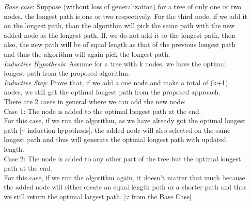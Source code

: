 \documentclass{article}
\begin{document}
\textit{Base case}: Suppose (without loss of generalization) for a tree of only one or two nodes, the longest path is one or two respectively. For the third node, if we add it on the longest path, than the algorithm will pick the same path with the new added node as the longest path. If, we do not add it to the longest path, then also, the new path will be of equal length as that of the previous longest path and thus the algorithm will again pick the longest path.\\

\textit{Inductive Hypothesis}: Assume for a tree with k nodes, we have the optimal longest path from the proposed algorithm.\\

\textit{Inductive Step}: Prove that, if we add a one node and make a total of (k+1) nodes, we still get the optimal longest path from the proposed approach.\\

There are 2 cases in general where we can add the new node:\\
Case 1: The node is added to the optimal longest path at the end.\\
For this case, if we run the algorithm, as we have already got the optimal longest path [$\because$ induction hypothesis], the added node will also selected on the same longest path and thus will generate the optimal longest path with updated length.\\ 
Case 2: The node is added to any other part of the tree but the optimal longest path at the end.\\
For this case, if we run the algorithm again, it doesn't matter that much because the added node will either create an equal length path or a shorter path and thus we still return the optimal largest path. [$\because$ from the Base Case]
\end{document}
